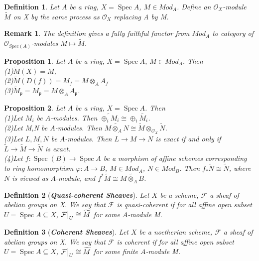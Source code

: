 \documentclass{ctexart}
\newtheorem{definition}{Definition}[section]
\newtheorem{remark}{Remark}[section]
\newtheorem{proposition}{Proposition}[section]
\newcommand{\spec}{\operatorname{Spec}}
\begin{document}
\begin{definition}
    Let $A$ be a ring, $X = \spec A$, $M\in Mod_{A}$.
    Define an $\mathcal{O}_{X}$-module $\widetilde{M}$ on X by the same process as $\mathcal{O}_{X}$ replacing A by M.
\end{definition}
\begin{remark}
    The definition gives a fully faithful functor from $Mod_{A}$ to category of $\mathcal{O}_{Spec(A)}$-modules $M \longmapsto \widetilde{M}$.
\end{remark}
\begin{proposition}
    Let $A$ be a ring, $X = \spec A$, $M\in Mod_{A}$.
    Then \\
    (1)$\widetilde{M}(X) = M$, \\
    (2)$\widetilde{M}(D(f)) = M_{f} = M \otimes_{A} A_{f}$ \\
    (3)$\widetilde{M}_{\mathfrak{p}} = M_{\mathfrak{p}} = M \otimes_{A} A_{\mathfrak{p}}$.
    \label{Proposition 6.1}
\end{proposition}
\begin{proposition}
    Let $A$ be a ring, $X = \spec A$.
    Then \\
    (1)Let $M_{i}$ be $A$-modules. 
    Then $\widetilde{\oplus_{i} M_{i}} \cong \oplus_{i} \widetilde{M_{i}}$. \\
    (2)Let M,N be $A$-modules.
    Then $\widetilde{M \otimes_{A} N} \cong \widetilde{M} \otimes_{\mathcal{O}_{X}} \widetilde{N}$. \\
    (3)Let $L,M,N$ be $A$-modules.
    Then $L \longrightarrow M \longrightarrow N$ is exact if and only if $\widetilde{L} \longrightarrow \widetilde{M} \longrightarrow \widetilde{N}$ is exact. \\
    (4)Let $f: \spec(B) \longrightarrow \spec A$ be a morphism of affine schemes corresponding to ring homomorphism $\varphi: A \longrightarrow B$, $M\in Mod_{A}$, $N\in Mod_{B}$.
    Then $f_{\ast}\widetilde{N} \cong \widetilde{N}$, where $N$ is viewed as $A$-module, and $f^{\ast}\widetilde{M} \cong \widetilde{M \otimes_{A} B}$.
    \label{Proposition 6.2}
\end{proposition}
\begin{definition}[\textbf{\emph{Quasi-coherent Sheaves}}]
    Let $X$ be a scheme, $\mathcal{F}$ a sheaf of abelian groups on X.
    We say that $\mathcal{F}$ is quasi-coherent if for all affine open subset $U = \spec A \subseteq X$,
    $\mathcal{F}\big{|}_{U} \cong \widetilde{M}$ for some $A$-module M.
\end{definition}
\begin{definition}[\textbf{\emph{Coherent Sheaves}}]
    Let $X$ be a noetherian scheme, $\mathcal{F}$ a sheaf of abelian groups on X.
    We say that $\mathcal{F}$ is coherent if for all affine open subset $U = \spec A \subseteq X$,
    $\mathcal{F}\big{|}_{U} \cong \widetilde{M}$ for some finite $A$-module M.
\end{definition}
\end{document}
